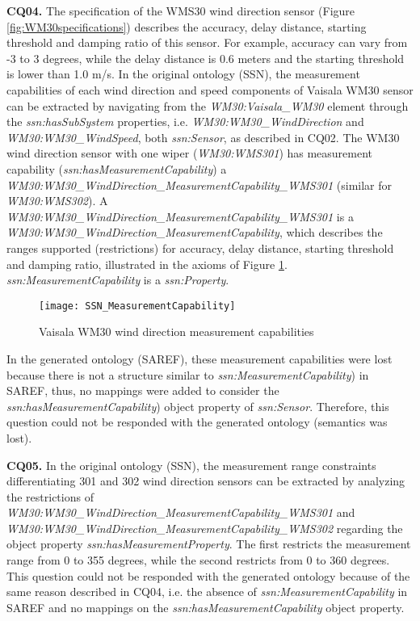 \documentclass{sig-alternate-05-2015}
\begin{document}
\textbf{CQ04.} The specification of the WMS30 wind direction sensor (Figure \ref{fig:WM30specifications}) describes the accuracy, delay distance, starting threshold and damping ratio of this sensor. For example, accuracy can vary from -3 to 3 degrees, while the delay distance is 0.6 meters and the starting threshold is lower than 1.0 m/s. 
In the original ontology (SSN), the measurement capabilities of each wind direction and speed components  of Vaisala WM30 sensor can be extracted by navigating from the \textit{WM30:Vaisala\_WM30} element through the \textit{ssn:hasSubSystem} properties, i.e. \textit{WM30:WM30\_WindDirection} and \textit{WM30:WM30\_WindSpeed}, both \textit{ssn:Sensor}, as described in CQ02. The WM30 wind direction sensor with one wiper (\textit{WM30:WMS301}) has measurement capability (\textit{ssn:hasMeasurementCapability}) a  \textit{WM30:WM30\_WindDirection\_MeasurementCapability\_WMS301} (similar for \textit{WM30:WMS302}). A \textit{WM30:WM30\_WindDirection\_MeasurementCapability\_WMS301} is a \textit{WM30:WM30\_WindDirection\_MeasurementCapability}, which describes the ranges supported (restrictions) for accuracy, delay distance, starting threshold and damping ratio, illustrated in the axioms of Figure \ref{fig:SSN_MeasurementCapability}. \textit{ssn:MeasurementCapability} is a \textit{ssn:Property}. 

\begin{figure}[h!]
\centering
\texttt{[image: SSN\_MeasurementCapability]}
\caption{Vaisala WM30 wind direction measurement capabilities} 
\label{fig:SSN_MeasurementCapability}
\end{figure}

In the generated ontology (SAREF), these measurement capabilities were lost because there is not a structure similar to \textit{ssn:MeasurementCapability}) in SAREF, thus, no mappings were added to consider the  \textit{ssn:hasMeasurementCapability}) object property of \textit{ssn:Sensor}. Therefore, this question could not be responded with the generated ontology (semantics was lost).  

\textbf{CQ05.} In the original ontology (SSN), the measurement range constraints differentiating 301 and 302 wind direction sensors can be extracted by analyzing the restrictions of \textit{WM30:WM30\_WindDirection\_MeasurementCapability\_WMS301} and \textit{WM30:WM30\_WindDirection\_MeasurementCapability\_WMS302} regarding the object property \textit{ssn:hasMeasurementProperty}. The first restricts the measurement range from 0 to 355 degrees, while the second restricts from 0 to 360 degrees. This question could not be responded with the generated ontology because of the same reason described in CQ04, i.e. the absence of \textit{ssn:MeasurementCapability} in SAREF and no mappings on the \textit{ssn:hasMeasurementCapability} object property.
\end{document}
